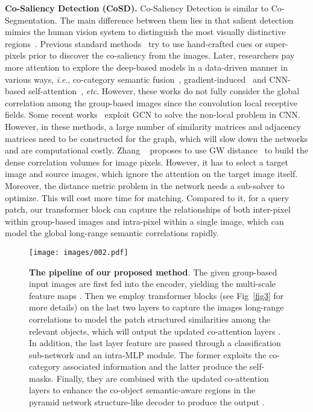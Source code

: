 \documentclass[journal]{IEEEtran}
\newcommand{\ie}{\textit{i}.\textit{e}., }
\newcommand{\etc}{\textit{etc}}
\begin{document}
\textbf{Co-Saliency Detection (CoSD).} Co-Saliency Detection is similar to Co-Segmentation. The main difference between them lies in that salient detection mimics the human vision system to distinguish the most visually distinctive regions~\cite{zhang2020gradient,zhang2021deepacg}. Previous standard methods~\cite{li2013co,song2016rgbd,jerripothula2016cats} try to use hand-crafted cues or super-pixels prior to  discover the co-saliency from the images.
Later, researchers pay more attention to explore the deep-based models in a data-driven manner in various ways, \ie co-category semantic fusion~\cite{wang2019robust,zhang2020deep}, gradient-induced~\cite{zhang2020gradient} and CNN-based self-attention~\cite{fan2021group,zhang2021summarize}, \etc. However, these works do not fully consider the global correlation among the group-based images since the convolution local receptive fields. 
Some recent works~\cite{jiang2019unified,zhang2020adaptive} exploit GCN to solve the non-local problem in CNN. However, in these methods, a large number of similarity matrices and adjacency matrices need to be constructed for the graph, which will slow down the networks and are computational costly. Zhang ~\cite{zhang2021deepacg} proposes to use GW distance~\cite{memoli2014gromov} to build the dense correlation volumes for image pixels.
However, it has to select a target image and source images, which ignore the attention on the target image itself. Moreover, the distance metric problem in the network needs a sub-solver to optimize. This will cost more time for matching.
Compared to it, for a query patch, our transformer block can capture the relationships of both inter-pixel within group-based images and intra-pixel within a single image, which can model the global long-range semantic correlations rapidly. 

\begin{figure*}[t]
		\begin{center}
			\centering
			\texttt{[image: images/002.pdf]}
		\end{center}
		\caption{\textbf{The pipeline of our proposed method}. The given group-based input images  are first fed into the encoder, yielding the multi-scale feature maps . Then we employ transformer blocks (see Fig~\ref{fig3} for more details) on the last two layers to capture the images long-range correlations to model the patch structured similarities among the relevant objects, which will output the updated co-attention layers . In addition, the last layer feature are passed through a classification sub-network and an intra-MLP module. The former exploits the co-category associated information and the latter produce the self-masks. Finally, they are combined with the updated co-attention layers to enhance the co-object semantic-aware regions in the pyramid network structure-like decoder to produce the output .}
		\label{fig2}
\end{figure*}
\end{document}
